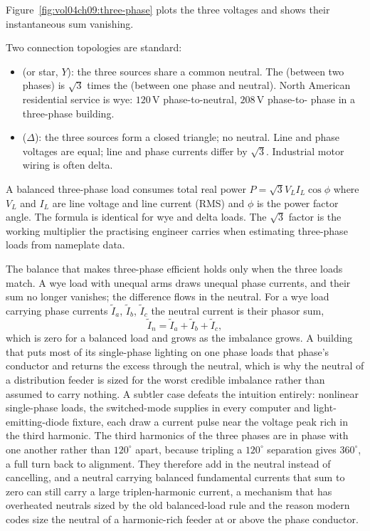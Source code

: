 

Figure~\ref{fig:vol04ch09:three-phase} plots the three voltages and
shows their instantaneous sum vanishing.

Two connection topologies are standard:
\begin{itemize}[leftmargin=*]
  \item {} (or star, $Y$): the three sources share a common
    neutral. The  (between two phases) is
    $\sqrt{3}$ times the  (between one phase
    and neutral). North American residential service is wye:
    $120\,\si{\volt}$ phase-to-neutral, $208\,\si{\volt}$ phase-to-
    phase in a three-phase building.
  \item {} ($\Delta$): the three sources form a closed
    triangle; no neutral. Line and phase voltages are equal; line and
    phase currents differ by $\sqrt{3}$. Industrial motor wiring is
    often delta.
\end{itemize}

A balanced three-phase load consumes total real power $P =
\sqrt{3}V_{L}I_{L}\cos\phi$ where $V_{L}$ and $I_{L}$ are line voltage
and line current (RMS) and $\phi$ is the power factor angle. The
formula is identical for wye and delta loads. The $\sqrt{3}$ factor is
the working multiplier the practising engineer carries when estimating
three-phase loads from nameplate data.

The balance that makes three-phase efficient holds only when the three
loads match. A wye load with unequal arms draws unequal phase currents, and
their sum no longer vanishes; the difference flows in the neutral. For a
wye load carrying phase currents $\tilde I_a$, $\tilde I_b$, $\tilde I_c$
the neutral current is their phasor sum,
\[
\tilde I_n = \tilde I_a + \tilde I_b + \tilde I_c,
\]
which is zero for a balanced load and grows as the imbalance grows. A
building that puts most of its single-phase lighting on one phase loads that
phase's conductor and returns the excess through the neutral, which is why
the neutral of a distribution feeder is sized for the worst credible
imbalance rather than assumed to carry nothing. A subtler case defeats the
intuition entirely: nonlinear single-phase loads, the switched-mode supplies
in every computer and light-emitting-diode fixture, each draw a current
pulse near the voltage peak rich in the third harmonic. The third harmonics
of the three phases are in phase with one another rather than $120^\circ$
apart, because tripling a $120^\circ$ separation gives $360^\circ$, a full
turn back to alignment. They therefore add in the neutral instead of
cancelling, and a neutral carrying balanced fundamental currents that sum to
zero can still carry a large triplen-harmonic current, a mechanism that has
overheated neutrals sized by the old balanced-load rule and the reason modern
codes size the neutral of a harmonic-rich feeder at or above the phase
conductor.


